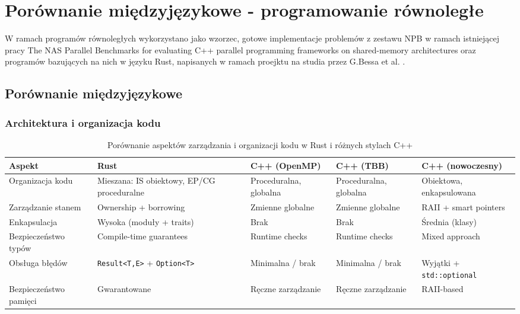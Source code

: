 \chapter{Porównanie międzyjęzykowe - programowanie równoległe}
W ramach programów równoległych wykorzystano jako wzorzec, gotowe implementacje problemów z zestawu NPB w ramach istniejącej pracy The NAS Parallel Benchmarks for evaluating C++ parallel programming frameworks on shared-memory architectures \cite{CPPNPB} oraz programów bazujących na nich w języku Rust, napisanych w ramach proejktu na studia przez G.Bessa et al. \cite{NPBRust}.






\section{Porównanie międzyjęzykowe}
\subsection{Architektura i organizacja kodu}
\begin{table}[H]
    \centering
    \caption{Porównanie aspektów zarządzania i organizacji kodu w Rust i różnych stylach C++}
    \begin{tabularx}{\textwidth}{lXXXX}
    \toprule
    \textbf{Aspekt} &
    \textbf{Rust} &
    \textbf{C++ (OpenMP)} &
    \textbf{C++ (TBB)} &
    \textbf{C++ (nowoczesny)} \\
    \midrule
    Organizacja kodu &
    Mieszana: IS obiektowy, EP/CG proceduralne &
    Proceduralna, globalna &
    Proceduralna, globalna &
    Obiektowa, enkapsulowana \\
    \hline
    Zarządzanie stanem &
    Ownership + borrowing &
    Zmienne globalne &
    Zmienne globalne &
    RAII + smart pointers \\
    \hline
    Enkapsulacja &
    Wysoka (moduły + traits) &
    Brak &
    Brak &
    Średnia (klasy) \\
    \hline
    Bezpieczeństwo typów &
    Compile-time guarantees &
    Runtime checks &
    Runtime checks &
    Mixed approach \\
    \hline
    Obsługa błędów &
    \texttt{Result<T,E>} + \texttt{Option<T>} &
    Minimalna / brak &
    Minimalna / brak &
    Wyjątki + \texttt{std::optional} \\
    \hline
    Bezpieczeństwo pamięci &
    Gwarantowane &
    Ręczne zarządzanie &
    Ręczne zarządzanie &
    RAII-based \\
    \bottomrule
    \end{tabularx}
\end{table}

